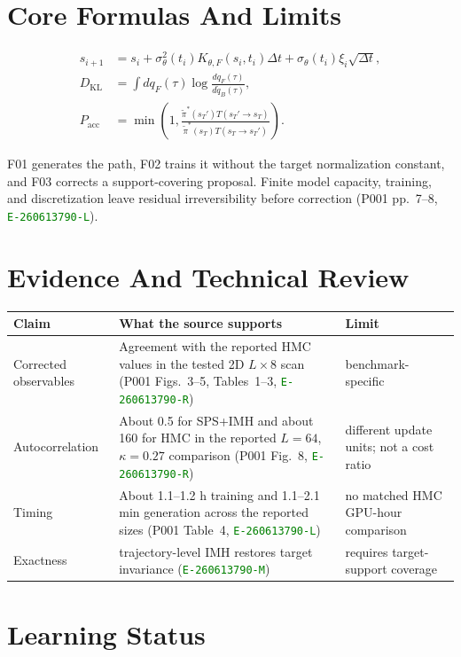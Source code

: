 \documentclass[10pt]{article}
\newcommand{\eid}[1]{\textcolor{green}{\texttt{#1}}}
\begin{document}
\section{Core Formulas And Limits}

\begin{align}
s_{i+1} &= s_i+\sigma_\theta^2(t_i)K_{\theta,F}(s_i,t_i)\Delta t
 +\sigma_\theta(t_i)\xi_i\sqrt{\Delta t}, \tag{F01}\\
D_{\mathrm{KL}} &= \int dq_F(\tau)\log\!\frac{dq_F(\tau)}{d\widetilde q_B(\tau)}, \tag{F02}\\
P_{\mathrm{acc}} &= \min\!\left(1,
\frac{\widetilde\pi^*(s_T')T(s_T'\!\to s_T)}
{\widetilde\pi^*(s_T)T(s_T\!\to s_T')}\right). \tag{F03}
\end{align}

F01 generates the path, F02 trains it without the target normalization
constant, and F03 corrects a support-covering proposal. Finite model capacity,
training, and discretization leave residual irreversibility before correction
(P001 pp.~7--8, \eid{E-260613790-L}).

\section{Evidence And Technical Review}

\begin{tabularx}{\linewidth}{@{}P{2.5cm}Y P{3.5cm}@{}}
\toprule
Claim & What the source supports & Limit \\
\midrule
Corrected observables & Agreement with the reported HMC values in the tested
2D $L\times 8$ scan (P001 Figs.~3--5, Tables~1--3,
\eid{E-260613790-R}) & benchmark-specific \\
Autocorrelation & About 0.5 for SPS+IMH and about 160 for HMC in the reported
$L=64$, $\kappa=0.27$ comparison (P001 Fig.~8,
\eid{E-260613790-R}) & different update units; not a cost ratio \\
Timing & About 1.1--1.2 h training and 1.1--2.1 min generation across the
reported sizes (P001 Table~4, \eid{E-260613790-L}) & no matched HMC GPU-hour comparison \\
Exactness & trajectory-level IMH restores target invariance
(\eid{E-260613790-M}) & requires target-support coverage \\
\bottomrule
\end{tabularx}

\section{Learning Status}
\end{document}
